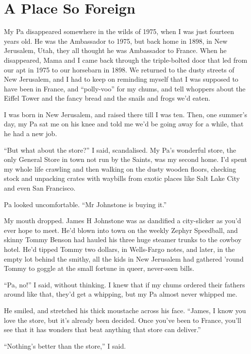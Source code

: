 \section{A Place So Foreign}

My Pa disappeared somewhere in the wilds of 1975, when I was just
fourteen years old. He was the Ambassador to 1975, but back home in
1898, in New Jerusalem, Utah, they all thought he was Ambassador to
France. When he disappeared, Mama and I came back through the
triple-bolted door that led from our apt in 1975 to our horsebarn
in 1898. We returned to the dusty streets of New Jerusalem, and I
had to keep on reminding myself that I was supposed to have been in
France, and ``polly-voo'' for my chums, and tell whoppers about the
Eiffel Tower and the fancy bread and the snails and frogs we'd
eaten.

I was born in New Jerusalem, and raised there till I was ten. Then,
one summer's day, my Pa sat me on his knee and told me we'd be
going away for a while, that he had a new job.

``But what about the store?'' I said, scandalised. My Pa's
wonderful store, the only General Store in town not run by the
Saints, was my second home. I'd spent my whole life crawling and
then walking on the dusty wooden floors, checking stock and
unpacking crates with waybills from exotic places like Salt Lake
City and even San Francisco.

Pa looked uncomfortable. ``Mr Johnstone is buying it.''

My mouth dropped. James H Johnstone was as dandified a city-slicker
as you'd ever hope to meet. He'd blown into town on the weekly
Zephyr Speedball, and skinny Tommy Benson had hauled his three huge
steamer trunks to the cowboy hotel. He'd tipped Tommy two dollars,
in Wells-Fargo notes, and later, in the empty lot behind the
smithy, all the kids in New Jerusalem had gathered 'round Tommy to
goggle at the small fortune in queer, never-seen bills.

``Pa, no!'' I said, without thinking. I knew that if my chums
ordered their fathers around like that, they'd get a whipping, but
my Pa almost never whipped me.

He smiled, and stretched his thick moustache across his face.
``James, I know you love the store, but it's already been decided. Once you've 
been to France, you'll see that it has wonders that beat anything that store 
can deliver.''

``Nothing's better than the store,'' I said.

